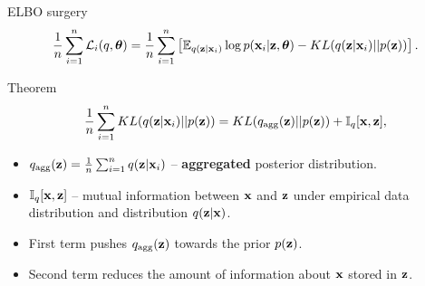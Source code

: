 \begin{frame}{ELBO surgery}
	\vspace{-0.3cm}
	\[
	    \frac{1}{n} \sum_{i=1}^n \mathcal{L}_i(q, \boldsymbol{\theta}) = \frac{1}{n} \sum_{i=1}^n \left[ \mathbb{E}_{q(\mathbf{z} | \mathbf{x}_i)} \log p(\mathbf{x}_i | \mathbf{z}, \boldsymbol{\theta}) - KL(q(\mathbf{z} | \mathbf{x}_i) || p(\mathbf{z})) \right].
	\]
	\vspace{-0.3cm}
	\begin{block}{Theorem}
		\[
		    \frac{1}{n} \sum_{i=1}^n KL(q(\mathbf{z} | \mathbf{x}_i) || p(\mathbf{z})) = KL(q_{\text{agg}}(\mathbf{z}) || p(\mathbf{z})) + \mathbb{I}_{q} [\mathbf{x}, \mathbf{z}],
		\]
		\begin{itemize}
			\item $q_{\text{agg}}(\mathbf{z}) = \frac{1}{n} \sum_{i=1}^n q(\mathbf{z} | \mathbf{x}_i)$ -- \textbf{aggregated} posterior distribution.
			\item $\mathbb{I}_{q} [\mathbf{x}, \mathbf{z}]$ -- mutual information between $\mathbf{x}$ and $\mathbf{z}$ under empirical data distribution and distribution $q(\mathbf{z} | \mathbf{x})$.
			\item First term pushes $q_{\text{agg}}(\mathbf{z})$ towards the prior $p(\mathbf{z})$.
			\item Second term reduces the amount of	information about $\mathbf{x}$ stored in $\mathbf{z}$. 
		\end{itemize}
	\end{block}
\end{frame}
